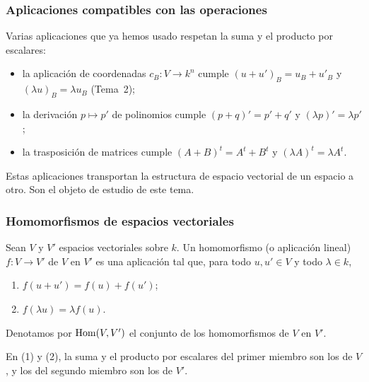 
\begin{frame}
    \frametitle{Aplicaciones compatibles con las operaciones}

    Varias aplicaciones que ya hemos usado \alert{respetan} la suma y el
    producto por escalares:
    \begin{itemize}
        \item la aplicación de coordenadas $c_B\colon V\to k^n$ cumple
        $(u+u')_B=u_B+u'_B$ y $(\lambda u)_B=\lambda u_B$ (Tema~2);
        \item la derivación $p\mapsto p'$ de polinomios cumple
        $(p+q)'=p'+q'$ y $(\lambda p)'=\lambda p'$;
        \item la trasposición de matrices cumple $(A+B)^t=A^t+B^t$ y
        $(\lambda A)^t=\lambda A^t$.
    \end{itemize}

    \medskip

    Estas aplicaciones \alert{transportan} la estructura de espacio
    vectorial de un espacio a otro. Son el objeto de estudio de este
    tema.
\end{frame}


\begin{frame}
    \frametitle{Homomorfismos de espacios vectoriales}

    \begin{definition}
        Sean $V$ y $V'$ espacios vectoriales sobre $k$. Un
        \alert{homomorfismo} (o \alert{aplicación lineal}) $f\colon V\to V'$ de $V$ en $V'$
        es una aplicación tal que, para todo
        $u,u'\in V$ y todo $\lambda\in k$,
        \begin{enumerate}[(1)]
            \item $f(u+u')=f(u)+f(u')$;
            \item $f(\lambda u)=\lambda f(u)$.
        \end{enumerate}
        Denotamos por $\operatorname{Hom}(V,V')$ el conjunto de los homomorfismos de $V$
        en $V'$.
    \end{definition}

    \medskip

    En (1) y (2), la suma y el producto por escalares del primer miembro
    son los de $V$, y los del segundo miembro son los de $V'$.
\end{frame}


